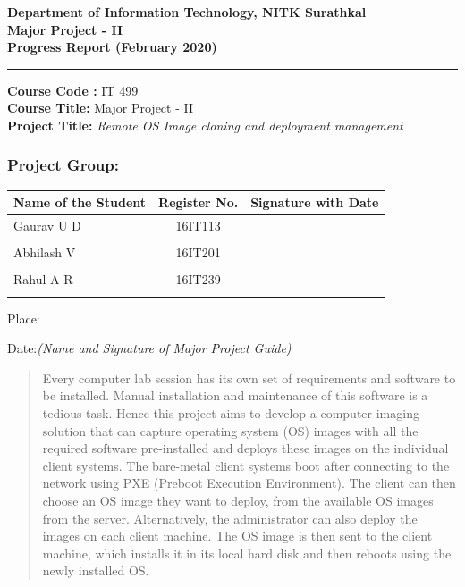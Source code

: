 \documentclass[a4paper,12pt]{article}
\begin{document}
\begin{center}
\textbf{\large{Department of Information Technology, NITK Surathkal}} \\

\textbf{\large{Major Project - II}} \\
\textbf{\large{Progress Report (February 2020)}} \\
\noindent\rule{12cm}{0.4pt}
\end{center}


\noindent
\textbf{Course Code :} IT 499 \\
\textbf{Course Title:} Major Project - II \\
\textbf{Project Title:} \emph{Remote OS Image cloning and  deployment management}   %

\subsubsection*{Project Group:}
\begin{tabular}{lcl}
\hline                         %
Name of the Student & Register No. & Signature with Date             \\
\hline
Gaurav U D            &16IT113        &                            \\\\
Abhilash V            &16IT201        &                            \\\\
Rahul A R            &16IT239        &                            \\\\
\hline
\end{tabular} 

\vspace{5 em}

Place:

Date:\hfill \textit{(Name and Signature of Major Project Guide)}




\newpage
         \begin{abstract}
Every computer lab session has its own set of requirements and software to be installed. Manual installation and maintenance of this software is a tedious task. Hence this project aims to develop a computer imaging solution that can capture operating system (OS) images with all the required software pre-installed and deploys these images on the individual client systems.
The bare-metal client systems boot after connecting to the network using PXE (Preboot Execution Environment). The client can then choose an OS image they want to deploy,  from the available OS images from the server. Alternatively, the administrator can also deploy the images on each client machine. The OS image is then sent to the client machine, which installs it in its local hard disk and then reboots using the newly installed OS.



    \end{abstract}
\end{document}
